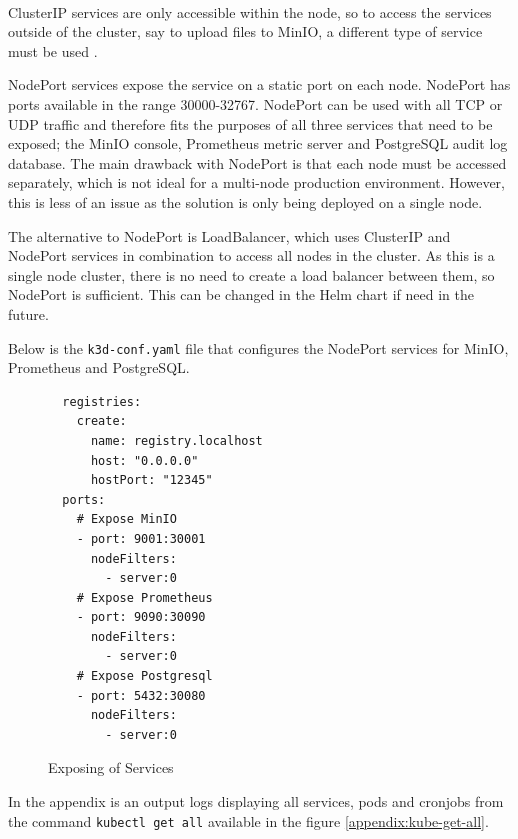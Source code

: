 \documentclass[12pt, conference, final, a4paper, onecolumn, compsoc]{IEEEtran}
\begin{document}
\paragraph{}

ClusterIP services are only accessible within the node, so to access the
services outside of the cluster, say to upload files to MinIO, a different type
of service must be used \citep{kube-svc}.

NodePort services expose the service on a static port on each node. NodePort has
ports available in the range 30000-32767. NodePort can be used with all TCP or
UDP traffic and therefore fits the purposes of all three services that need to
be exposed; the MinIO console, Prometheus metric server and PostgreSQL audit log
database. The main drawback with NodePort is that each node must be accessed
separately, which is not ideal for a multi-node production environment. However,
this is less of an issue as the solution is only being deployed on a single
node.

The alternative to NodePort is LoadBalancer, which uses ClusterIP and NodePort
services in combination to access all nodes in the cluster. As this is a single
node cluster, there is no need to create a load balancer between them, so
NodePort is sufficient. This can be changed in the Helm chart if need in the
future.

Below is the \texttt{k3d-conf.yaml} file that configures the NodePort services
for MinIO, Prometheus and PostgreSQL.

\begin{figure}[H]
\begin{lstlisting}
  registries:
    create:
      name: registry.localhost
      host: "0.0.0.0"
      hostPort: "12345"
  ports:
    # Expose MinIO
    - port: 9001:30001
      nodeFilters:
        - server:0
    # Expose Prometheus
    - port: 9090:30090
      nodeFilters:
        - server:0
    # Expose Postgresql
    - port: 5432:30080
      nodeFilters:
        - server:0
\end{lstlisting}
  \caption{Exposing of Services}
  \label{fig:expose-services}
\end{figure}



In the appendix is an output logs displaying all services, pods and cronjobs
from the command \texttt{kubectl get all} available in the figure \ref{appendix:kube-get-all}.
\end{document}
